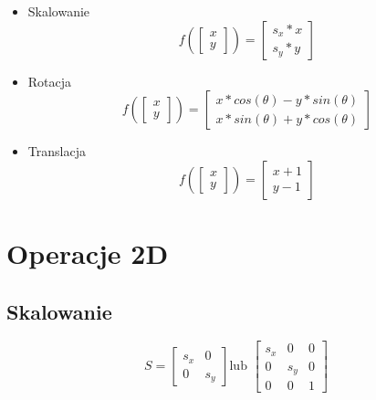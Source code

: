 \documentclass{../notatki}
\begin{document}
\begin{itemize}
    \item Skalowanie\\
    $$
    f(
        \begin{bmatrix}
        x \\
        y
        \end{bmatrix}
    )
    =
    \begin{bmatrix}
        s_x * x \\
        s_y * y
    \end{bmatrix}
    $$
    \item Rotacja\\
    $$
    f(
        \begin{bmatrix}
        x \\
        y
        \end{bmatrix}
    )
    =
    \begin{bmatrix}
        x * cos(\theta) - y * sin(\theta) \\
        x * sin(\theta) + y * cos(\theta)
    \end{bmatrix}
    $$
    \item Translacja\\
    $$
    f(
        \begin{bmatrix}
        x \\
        y
        \end{bmatrix}
    )
    =
    \begin{bmatrix}
        x + 1 \\
        y - 1
    \end{bmatrix}
    $$
\end{itemize}

\section{Operacje 2D}

\subsection{Skalowanie}

$$
S = \begin{bmatrix}
        s_x & 0 \\
        0 & s_y
    \end{bmatrix}
\text{lub }
\begin{bmatrix} s_x & 0 & 0 \\ 0 & s_y & 0 \\ 0 & 0 & 1 \end{bmatrix}
$$
\end{document}
